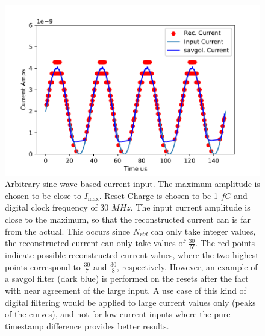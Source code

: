 \begin{figure}[]
\centering
\includegraphics[width=\textwidth]{images/savgol.pdf}
\caption{Arbitrary sine wave based current input.
The maximum amplitude is chosen to be close to $I_{\mathrm{max}}$.
Reset Charge is chosen to be 1 $\unit{fC}$ and digital clock frequency of 30 $\unit{MHz}$.
The input current amplitude is close to the maximum, so that the reconstructed current can is far from the actual.
This occurs since $N_{rtd}$ can only take integer values, the reconstructed current can only take values of $\frac{30}{N}$.
The red points indicate possible reconstructed current values, where the two highest points correspond to $\frac{30}{7}$ and $\frac{30}{8}$, respectively.
However, an example of a savgol filter (dark blue) is performed on the resets after the fact with near agreement of the large input.
A use case of this kind of digital filtering would be applied to large current values only (peaks of the curves), and not for low current inputs where the pure timestamp difference provides better results.}
\label{fig:savgol}
\end{figure}

